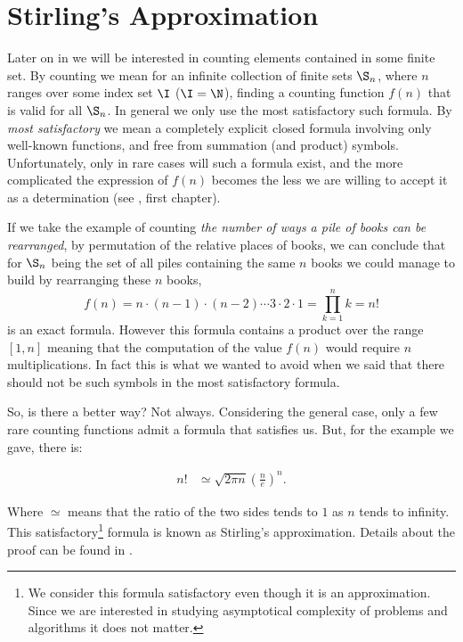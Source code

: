 \section{Stirling's Approximation}
\label{tree:sorting:stirling}

Later on in  we will be interested in counting elements
contained in some
finite set. By counting we mean for an infinite collection of finite sets
$\S_n$, where $n$ ranges over some index set $\I$ (\eg $\I = \N$), finding a
counting function $f(n)$ that is valid for all $\S_n$. In general we only
use the most satisfactory such formula. By \emph{most satisfactory} we mean a
completely explicit closed formula involving only well-known functions, and
free from summation (and product) symbols. Unfortunately, only in rare cases
will such a formula exist, and the more complicated the expression of $f(n)$
becomes the less we are willing to accept it as a determination
(see \citet*{Stanley:2011:ECV:2124415}, first chapter).

If we take the example of counting \emph{the number of ways a pile of books can
be rearranged}, \ie by permutation of the relative places of books, we can
conclude that for $\S_n$ being the set of all piles containing the same $n$
books we could manage to build by rearranging these $n$ books,
\begin{displaymath}
f(n) = n \cdot (n-1) \cdot (n-2) \cdots 3 \cdot 2 \cdot 1 = \prod_{k=1}^n k = n!
\end{displaymath}
is an exact formula. However this formula contains a product over the range
$[1, n]$ meaning that the computation of the value $f(n)$ would require $n$
multiplications. In fact this is what we wanted to avoid when we said that
there should not be such symbols in the most satisfactory formula.

So, is there a better way? Not always. Considering the general case, only a few
rare counting functions admit a formula that satisfies us. But, for
the example we gave, there is:
\begin{theorem}
\label{tree:sorting:theorem/stirling}
\begin{align*}
n! &\simeq \sqrt{2 \pi n} \left(\frac{n}{e}\right)^n.
\end{align*}
\end{theorem}
Where \(\simeq\) means that the ratio of the two sides tends to \(1\) as \(n\)
tends to infinity.
This satisfactory\footnote{We consider this formula satisfactory even though it is
an approximation. Since we are interested in studying asymptotical complexity
of problems and algorithms it does not matter.} formula is known as Stirling's approximation. Details
about the proof can be found in \citet*{feller1967direct}.

